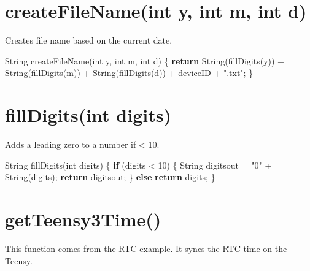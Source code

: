 \documentclass[]{book}
\newenvironment{Shaded}{\begin{snugshade}}{\end{snugshade}}
\newcommand{\ControlFlowTok}[1]{\textcolor[rgb]{0.13,0.29,0.53}{\textbf{#1}}}
\newcommand{\DataTypeTok}[1]{\textcolor[rgb]{0.13,0.29,0.53}{#1}}
\newcommand{\DecValTok}[1]{\textcolor[rgb]{0.00,0.00,0.81}{#1}}
\newcommand{\NormalTok}[1]{#1}
\newcommand{\StringTok}[1]{\textcolor[rgb]{0.31,0.60,0.02}{#1}}
\begin{document}
\hypertarget{createfilenameint-y-int-m-int-d}{%
\section*{createFileName(int y, int m, int d)}\label{createfilenameint-y-int-m-int-d}}

Creates file name based on the current date.

\begin{Shaded}
\begin{Highlighting}[]
\NormalTok{String createFileName(}\DataTypeTok{int}\NormalTok{ y, }\DataTypeTok{int}\NormalTok{ m, }\DataTypeTok{int}\NormalTok{ d) \{}
  \ControlFlowTok{return}\NormalTok{ String(fillDigits(y)) + String(fillDigits(m)) + String(fillDigits(d)) + deviceID + }\StringTok{".txt"}\NormalTok{;}
\NormalTok{\}}
\end{Highlighting}
\end{Shaded}

\hypertarget{filldigitsint-digits}{%
\section*{fillDigits(int digits)}\label{filldigitsint-digits}}

Adds a leading zero to a number if \textless{} 10.

\begin{Shaded}
\begin{Highlighting}[]
\NormalTok{String fillDigits(}\DataTypeTok{int}\NormalTok{ digits) \{}
  \ControlFlowTok{if}\NormalTok{ (digits < }\DecValTok{10}\NormalTok{) \{}
\NormalTok{    String digitsout = }\StringTok{"0"}\NormalTok{ + String(digits);}
    \ControlFlowTok{return}\NormalTok{ digitsout;}
\NormalTok{  \}}
  \ControlFlowTok{else} \ControlFlowTok{return}\NormalTok{ digits;}
\NormalTok{\}}
\end{Highlighting}
\end{Shaded}

\hypertarget{getteensy3time}{%
\section*{getTeensy3Time()}\label{getteensy3time}}

This function comes from the RTC example. It syncs the RTC time on the Teensy.
\end{document}
